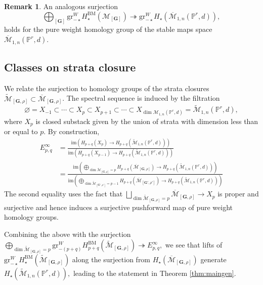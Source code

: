 \documentclass[12pt,reqno]{amsart}
\theoremstyle{definition}
\theoremstyle{definition}
\theoremstyle{definition}
\theoremstyle{definition}
\newtheorem{remark}[theorem]{Remark}
\newcommand{\ol}[1]{\overline{#1}}
\newcommand{\PP}{\mathbb{P}}
\newcommand{\Mcal}{\mathcal{M}}
\newcommand{\Mbar}{\ol{\Mcal}}
\newcommand{\Mtil}{\widetilde{\mathcal{M}}}
\newcommand{\gr}{\mathrm{gr}}
\begin{document}
\begin{remark}
  An analogous surjection $$\bigoplus_{[\mathbf{G}]}\gr^{W}_{-\star}H_\star^{\mathrm{BM}}(\mathcal{M}_{[\mathbf{G}]}) \twoheadrightarrow \mathrm{gr}^W_{-\star} H_\star(\Mbar_{1,n}(\mathbb{P}^r,d)),$$ holds for the pure weight homology group of the stable maps space $\Mbar_{1,n}(\PP^r,d).$
\end{remark}

\subsection{Classes on strata closure}\label{subsec:strcl}

We relate the surjection to homology groups of the strata closures $\Mtil_{[\mathbf{G},\rho]}\subset \Mbar_{[\mathbf{G},\rho]}$. The spectral sequence is induced by the filtration $$\varnothing = X_{-1}\subset \cdots \subset X_p\subset X_{p+1}\subset\cdots\subset X_{\dim \mathcal{M}_{1,n}(\PP^r,d)} = \Mtil_{1,n}(\PP^r,d),$$ where $X_p$ is closed substack given by the union of strata with dimension less than or equal to $p.$ By construction, 
 \begin{align*}
 E_{p,q}^{\infty} & = \frac{\mathrm{im}(H_{p+q}(X_p)\to H_{p+q}(\Mtil_{1,n}(\PP^r,d)))}{\mathrm{im}(H_{p+q}(X_{p-1})\to H_{p+q}(\Mtil_{1,n}(\PP^r,d)))}\\ &  = \frac{\mathrm{im}\left(\bigoplus_{\dim \Mtil_{[\mathbf{G},\rho]} = p}H_{p+q}(\Mbar_{[\mathbf{G},\rho]})\to H_{p+q}(\Mtil_{1,n}(\PP^r,d))\right)}{\mathrm{im}\left(\bigoplus_{\dim \Mtil_{[\mathbf{G}',\rho']} = p-1}H_{p+q}(\Mbar_{[\mathbf{G}',\rho']})\to H_{p+q}(\Mtil_{1,n}(\PP^r,d))\right)}
 \end{align*}
The second equality uses the fact that $\bigsqcup_{\dim \Mtil_{[\mathbf{G},\rho]} = p} \Mbar_{[\mathbf{G},\rho]}\to X_p$ is proper and surjective and hence induces a surjective pushforward map of pure weight homology groups. 

Combining the above with the surjection $\bigoplus_{\dim \Mtil_{[\mathbf{G},\rho]} = p}\gr^W_{-(p+q)}H_{p+q}^{\mathrm{BM}}(\Mtil_{[\mathbf{G},\rho]})\twoheadrightarrow E^{\infty}_{p,q},$ we see that lifts of $\gr^W_{-\star}H_{\star}^{\mathrm{BM}}(\Mtil_{[\mathbf{G},\rho]})$ along the surjection from $H_\star(\Mbar_{[\mathbf{G},\rho]})$ generate $H_{\star}(\Mtil_{1,n}(\PP^r,d)),$ leading to the statement in Theorem \ref{thm:maingen}.
\end{document}
